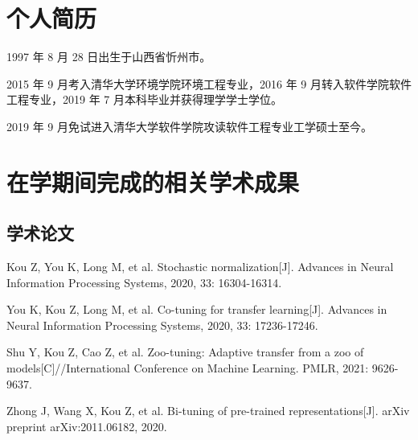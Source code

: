 
\begin{resume}

  \section*{个人简历}

  1997 年 8 月 28 日出生于山西省忻州市。

  2015 年 9 月考入清华大学环境学院环境工程专业，2016 年 9 月转入软件学院软件工程专业，2019 年 7 月本科毕业并获得理学学士学位。

  2019 年 9 月免试进入清华大学软件学院攻读软件工程专业工学硕士至今。


  \section*{在学期间完成的相关学术成果}

  \subsection*{学术论文}

  \begin{achievements}
    \item Kou Z, You K, Long M, et al. Stochastic normalization[J]. Advances in Neural Information Processing Systems, 2020, 33: 16304-16314.
    \item You K, Kou Z, Long M, et al. Co-tuning for transfer learning[J]. Advances in Neural Information Processing Systems, 2020, 33: 17236-17246.
    \item Shu Y, Kou Z, Cao Z, et al. Zoo-tuning: Adaptive transfer from a zoo of models[C]//International Conference on Machine Learning. PMLR, 2021: 9626-9637.
    \item Zhong J, Wang X, Kou Z, et al. Bi-tuning of pre-trained representations[J]. arXiv preprint arXiv:2011.06182, 2020.
  \end{achievements}

\end{resume}
